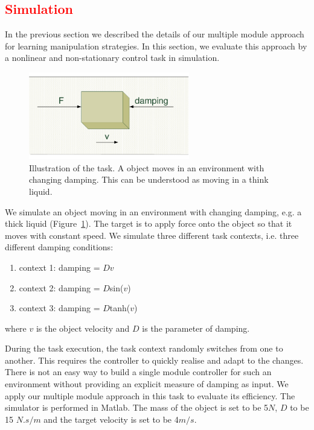 \textcolor{red}{\section{Simulation}}
\label{sec:diss}

In the previous section we described the details of our multiple module approach for learning manipulation strategies. In this section, we evaluate this approach by a nonlinear and non-stationary control task in simulation.

\begin{figure}
  \centering
  \includegraphics[width=7cm]{./fig/simulation.pdf}
  \caption{ \scriptsize{Illustration of the task. A object moves in an environment with changing damping. This can be understood as moving in a think liquid.}
}
\label{fig:simulation}
\end{figure}

We simulate an object moving in an environment with changing damping, e.g. a thick liquid (Figure~\ref{fig:simulation}). The target is to apply force onto the object so that it moves with constant speed. We simulate three different task contexts, i.e. three different damping conditions:

\begin{enumerate}
\item context 1: damping = $D$$v$
\item context 2: damping = $D$sin($v$)
\item context 3: damping = $D$tanh($v$)
\end{enumerate}
where $v$ is the object velocity and $D$ is the parameter of damping.

During the task execution, the task context randomly switches from one to another. This requires the controller to quickly realise and adapt to the changes. There is not an easy way to build a single module controller for such an environment without providing an explicit measure of damping as input. We apply our multiple module approach in this task to evaluate its efficiency. The simulator is performed in Matlab.
The mass of the object is set to be 5$N$, $D$ to be 15 $N.s/m$ and the target velocity is set to be 4$m/s$.

